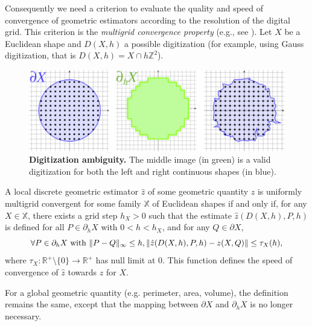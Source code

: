 \documentclass[review]{siamart220329}
\DeclarePairedDelimiter\norm{\lVert}{\rVert}%
\begin{document}
Consequently we need a criterion to evaluate the quality and speed
of convergence of geometric estimators according to the resolution of
the digital grid. This criterion is the \emph{multigrid convergence
property} (e.g., see \cite{klette2004digital}). Let $X$ be a Euclidean
shape and $D(X,h)$ a possible digitization (for example, using Gauss
digitization, that is $D(X,h) = X \cap h\mathbb{Z}^2$). 
%
%
\begin{figure}
\center
\includegraphics[scale=1]{figures/ambiguity-and-boundaries.png}
\caption{\textbf{Digitization ambiguity.} The middle image (in green) is a valid digitization for both the left and right continuous shapes (in blue).}
\label{fig:digitization-ambiguity}
\end{figure}
%
%
\begin{definition}
  A local discrete geometric estimator $\hat{z}$ of some geometric
  quantity $z$ is uniformly multigrid convergent for some family $\mathbb{X}$ of Euclidean shapes if
  and only if, for any $X \in \mathbb{X}$, there exists a grid step
  $h_X>0$ such that the estimate $\hat{z}(D(X,h), P,h)$ is
  defined for all $P \in \partial_hX$ with $ 0 < h < h_X$, and
  for any $Q \in \partial X$,
  \begin{equation*}
    \forall P \in  \partial_hX \text{ with } \norm{ P - Q }_{\infty} \leq h, \norm{ \hat{z}(D(X,h),P,h) - z(X,Q)} \leq \tau_{X}(h),			
  \end{equation*}
  where $\tau_{X}:\mathbb{R}^{+}\setminus\{0\} \rightarrow
  \mathbb{R}^{+}$ has null limit at $0$. This function defines the
  speed of convergence of $\hat{z}$ towards $z$ for $X$.
\end{definition}
	
For a global geometric quantity (e.g. perimeter, area, volume), the definition remains the same, except that the mapping
between $\partial X$ and $\partial_h X$ is no longer necessary.
\end{document}

